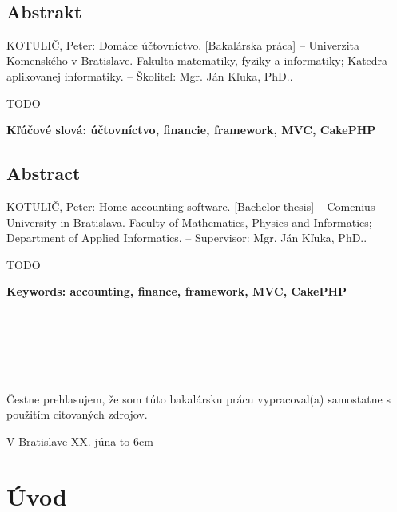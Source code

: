 \documentclass[12pt,onesided]{book}
\def\mftitle{Domáce účtovníctvo}
\def\mfthesistype{Bakalárska práca}
\begin{document}
\eject

\thispagestyle{empty}~\vfill\eject

\section*{Abstrakt}
KOTULIČ, Peter: \mftitle. [\mfthesistype] – Univerzita Komenského v Bratislave. Fakulta matematiky, fyziky a informatiky; Katedra aplikovanej informatiky. – Školiteľ: Mgr. Ján Kľuka, PhD.. 

TODO

{\bf Kľúčové slová: účtovníctvo, financie, framework, MVC, CakePHP}

\section*{Abstract}
KOTULIČ, Peter: Home accounting software. [Bachelor thesis] – Comenius University in Bratislava. Faculty of Mathematics, Physics and Informatics; Department of Applied Informatics. – Supervisor: Mgr. Ján Kľuka, PhD.. 

TODO

{\bf Keywords: accounting, finance, framework, MVC, CakePHP}

\eject

\thispagestyle{empty}~\vfill\eject

{~}\vspace{12cm}

\noindent
\begin{minipage}{0.25\textwidth}~\end{minipage}
\begin{minipage}{0.68\textwidth}
Čestne prehlasujem, že som túto bakalársku prácu vypracoval(a) samostatne s použitím citovaných zdrojov.

\bigskip\bigskip

V Bratislave XX. júna \hfill\hbox to 6cm{\dotfill}
\end{minipage}
\vfill\eject

\tableofcontents

\newpage


\mainmatter

\chapter{Úvod}\label{chap:intro}
\end{document}
